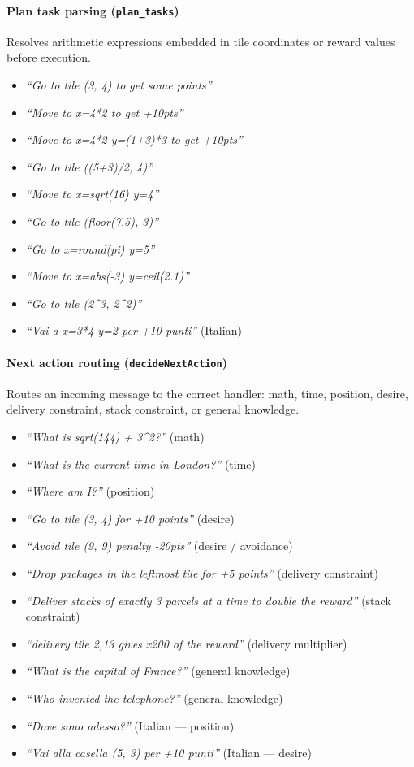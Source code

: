 \paragraph{Plan task parsing (\texttt{plan\_tasks})}
Resolves arithmetic expressions embedded in tile coordinates or reward values before execution.
\begin{itemize}
  \item \textit{``Go to tile (3, 4) to get some points''}
  \item \textit{``Move to x=4*2 to get +10pts''}
  \item \textit{``Move to x=4*2 y=(1+3)*3 to get +10pts''}
  \item \textit{``Go to tile ((5+3)/2, 4)''}
  \item \textit{``Move to x=sqrt(16) y=4''}
  \item \textit{``Go to tile (floor(7.5), 3)''}
  \item \textit{``Go to x=round(pi) y=5''}
  \item \textit{``Move to x=abs(-3) y=ceil(2.1)''}
  \item \textit{``Go to tile (2\^{}3, 2\^{}2)''}
  \item \textit{``Vai a x=3*4 y=2 per +10 punti''} \quad (Italian)
\end{itemize}

\paragraph{Next action routing (\texttt{decideNextAction})}
Routes an incoming message to the correct handler: math, time, position, desire, delivery constraint, stack constraint, or general knowledge.
\begin{itemize}
  \item \textit{``What is sqrt(144) + 3\^{}2?''} \quad (math)
  \item \textit{``What is the current time in London?''} \quad (time)
  \item \textit{``Where am I?''} \quad (position)
  \item \textit{``Go to tile (3, 4) for +10 points''} \quad (desire)
  \item \textit{``Avoid tile (9, 9) penalty -20pts''} \quad (desire / avoidance)
  \item \textit{``Drop packages in the leftmost tile for +5 points''} \quad (delivery constraint)
  \item \textit{``Deliver stacks of exactly 3 parcels at a time to double the reward''} \quad (stack constraint)
  \item \textit{``delivery tile 2,13 gives x200 of the reward''} \quad (delivery multiplier)
  \item \textit{``What is the capital of France?''} \quad (general knowledge)
  \item \textit{``Who invented the telephone?''} \quad (general knowledge)
  \item \textit{``Dove sono adesso?''} \quad (Italian — position)
  \item \textit{``Vai alla casella (5, 3) per +10 punti''} \quad (Italian — desire)
\end{itemize}

